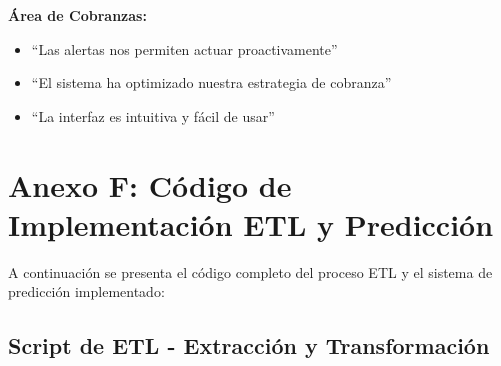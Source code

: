 \textbf{Área de Cobranzas:}
\begin{itemize}
\item ``Las alertas nos permiten actuar proactivamente''
\item ``El sistema ha optimizado nuestra estrategia de cobranza''
\item ``La interfaz es intuitiva y fácil de usar''
\end{itemize}
\section{Anexo F: Código de Implementación ETL y Predicción}

A continuación se presenta el código completo del proceso ETL y el sistema de predicción implementado:

\subsection{Script de ETL - Extracción y Transformación}

